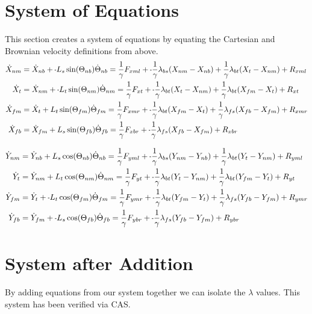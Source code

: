 \documentclass[11pt, landscape]{article}
\newcommand{\mn}{\scalebox{0.7}[1.0]{-}}
\begin{document}
\section{System of Equations}
This section creates a system of equations by equating the Cartesian and Brownian velocity definitions from above. \\

\begin{align}  
  \dot{X}_{nm} &= \dot{X}_{nb} + \mn L_{s}\sin(\Theta_{nb})\dot{\Theta}_{nb} = \frac{1}{\gamma}F_{xml} + \mn\frac{1}{\gamma}\lambda_{bs}(X_{nm} - X_{nb}) + \frac{1}{\gamma}\lambda_{bt}(X_{t } - X_{nm}) + R_{xml} \\
  \dot{X}_{t}  &= \dot{X}_{nm} + \mn L_{t}\sin(\Theta_{nm})\dot{\Theta}_{nm} = \frac{1}{\gamma}F_{xt } + \mn\frac{1}{\gamma}\lambda_{bt}(X_{t } - X_{nm}) + \frac{1}{\gamma}\lambda_{bt}(X_{fm} - X_{t }) + R_{xt } \\
  \dot{X}_{fm} &= \dot{X}_{t } + L_{t}\sin(\Theta_{fm})\dot{\Theta}_{fm} = \frac{1}{\gamma}F_{xmr} + \mn\frac{1}{\gamma}\lambda_{bt}(X_{fm} - X_{t }) + \frac{1}{\gamma}\lambda_{fs}(X_{fb} - X_{fm}) + R_{xmr} \\
  \dot{X}_{fb} &= \dot{X}_{fm} + L_{s}\sin(\Theta_{fb})\dot{\Theta}_{fb} = \frac{1}{\gamma}F_{xbr} + \mn\frac{1}{\gamma}\lambda_{fs}(X_{fb} - X_{fm}) + R_{xbr}
\end{align}

\begin{align}  
  \dot{Y}_{nm} &= \dot{Y}_{nb} + L_{s}\cos(\Theta_{nb})\dot{\Theta}_{nb} = \frac{1}{\gamma}F_{yml} + \mn\frac{1}{\gamma}\lambda_{bs}(Y_{nm} - Y_{nb}) + \frac{1}{\gamma}\lambda_{bt}(Y_{t } - Y_{nm}) + R_{yml} \\
  \dot{Y}_{t}  &= \dot{Y}_{nm} + L_{t}\cos(\Theta_{nm})\dot{\Theta}_{nm} = \frac{1}{\gamma}F_{yt } + \mn\frac{1}{\gamma}\lambda_{bt}(Y_{t } - Y_{nm}) + \frac{1}{\gamma}\lambda_{bt}(Y_{fm} - Y_{t }) + R_{yt } \\
  \dot{Y}_{fm} &= \dot{Y}_{t } + \mn L_{t}\cos(\Theta_{fm})\dot{\Theta}_{fm} = \frac{1}{\gamma}F_{ymr} + \mn\frac{1}{\gamma}\lambda_{bt}(Y_{fm} - Y_{t }) + \frac{1}{\gamma}\lambda_{fs}(Y_{fb} - Y_{fm}) + R_{ymr} \\
  \dot{Y}_{fb} &= \dot{Y}_{fm} + \mn L_{s}\cos(\Theta_{fb})\dot{\Theta}_{fb} = \frac{1}{\gamma}F_{ybr} + \mn\frac{1}{\gamma}\lambda_{fs}(Y_{fb} - Y_{fm}) + R_{ybr}
\end{align}

\section{System after Addition}
By adding equations from our system together we can isolate the $\lambda$ values. This system has been verified via CAS.\\
\end{document}
